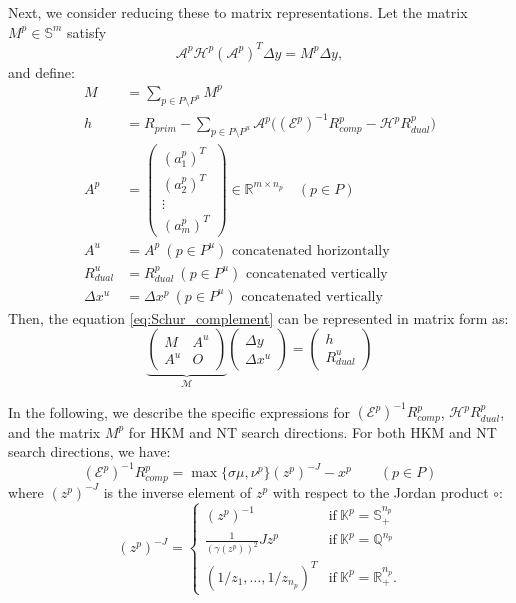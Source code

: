 Next, we consider reducing these to matrix representations. Let the matrix $M^p \in \mathbb{S}^{m}$ satisfy
\[
    \mathcal{A}^p\mathcal{H}^p(\mathcal{A}^p)^T \Delta y= M^p \Delta y,
\]
and define:
\begin{align*}
    M &= \sum_{p \in P \setminus P^u} M^p \\
    h &= R_{prim} - \sum_{p \in P \setminus P^u} \mathcal{A}^p\big((\mathcal{E}^p)^{-1}R_{comp}^p - \mathcal{H}^p R_{dual}^p\big)\\
    A^p &= \begin{pmatrix}
        (a^p_1)^T\\
        (a^p_2)^T\\
        \vdots\\
        (a^p_m)^T
    \end{pmatrix} \in \mathbb{R}^{m\times n_p} \quad (p\in P)\\
    A^u &= A^p ~ (p\in P^u)\text{ concatenated horizontally}\\
    R^u_{dual} &= R^p_{dual} ~ (p\in P^u)\text{ concatenated vertically}\\
    \Delta x^u &= \Delta x^p ~ (p\in P^u)\text{ concatenated vertically}
\end{align*}
Then, the equation \eqref{eq:Schur_complement} can be represented in matrix form as:
\[
    \underbrace{\left(\begin{array}{cc}
        M   & A^u \\
        A^u & O
    \end{array}\right)}_{\mathcal{M}}
    \left(\begin{array}{c}
        \Delta y   \\
        \Delta x^u 
    \end{array}\right) 
    = 
    \left(\begin{array}{c}
         h  \\
         R_{dual}^u 
    \end{array}
    \right)
    \label{eq:Schur_complement_Mat}
\]

In the following, we describe the specific expressions for $(\mathcal{E}^p)^{-1}R^p_{comp}$, $\mathcal{H}^p R^p_{dual}$, and the matrix $M^p$ for HKM and NT search directions. For both HKM and NT search directions, we have:
\[
    (\mathcal{E}^p)^{-1}R^p_{comp} = \max\{\sigma\mu, \nu^p\}(z^p)^{-J} - x^p \qquad (p \in P)
\]
where $(z^p)^{-J}$ is the inverse element of $z^p$ with respect to the Jordan product $\circ$:
\[
    (z^p)^{-J} = \begin{cases}
        (z^p)^{-1} & \text{if} ~ \mathbb{K}^p=\mathbb{S}^{n_p}_+ \\
        \frac{1}{(\gamma(z^p))^2} J z^p & \text{if} ~ \mathbb{K}^p=\mathbb{Q}^{n_p} \\
        (1/z_1, \ldots, 1/z_{n_p})^T & \text{if} ~ \mathbb{K}^p=\mathbb{R}^{n_p}_+.
    \end{cases}
\]


